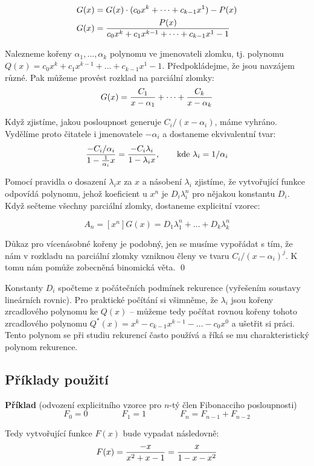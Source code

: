 \begin{align}
G(x) &= G(x)\cdot(c_0x^k + \dots + c_{k-1}x^1) - P(x) \\
G(x) &= {P(x)\over c_0x^k+c_1x^{k-1}+\dots +c_{k-1}x^1-1}
\end{align}

Nalezneme kořeny $\alpha_1, \dots, \alpha_k$ polynomu ve jmenovateli zlomku,
tj. polynomu $Q(x) = c_0x^k+c_1x^{k-1}+\dots +c_{k-1}x^1-1$. Předpokládejme,
že jsou navzájem různé. Pak můžeme provést rozklad na parciální zlomky:
$$G(x) = {C_1\over x-\alpha_1} + \dots + {C_k\over x-\alpha_k}$$

Když zjistíme, jakou posloupnost generuje $C_i/(x-\alpha_i)$, máme
vyhráno. Vydělíme proto čitatele i jmenovatele $-\alpha_i$ a dostaneme
ekvivalentní tvar:
$${-C_i/\alpha_i\over1-{1\over\alpha_i}x} = {-C_i\lambda_i\over 1-\lambda_ix},\qquad\text{kde}~\lambda_i = 1/\alpha_i$$

Pomocí pravidla o dosazení $\lambda_ix$ za $x$ a násobení $\lambda_i$
zjistíme, že vytvořující funkce odpovídá polynomu, jehož koeficient u $x^n$
je $D_i\lambda_i^n$ pro nějakou konstantu $D_i$. Když sečteme všechny parciální zlomky, dostaneme explicitní vzorec:

$$A_n = [x^n]G(x) = D_1\lambda_1^n + \dots + D_k\lambda_k^n$$

Důkaz pro vícenásobné kořeny je podobný, jen se musíme vypořádat s tím, že nám
v rozkladu na parciální zlomky vzniknou členy ve tvaru $C_i/(x-\alpha_i)^j$. K
tomu nám pomůže zobecněná binomická věta.
\qed

Konstanty $D_i$ spočteme z počátečních podmínek rekurence (vyřešením soustavy
lineárních rovnic). Pro praktické počítání si všimněme, že $\lambda_i$ jsou
kořeny zrcadlového polynomu ke $Q(x)$ -- můžeme tedy počítat rovnou kořeny
tohoto zrcadlového polynomu $Q^*(x) = x^k-c_{k-1}x^{k-1}-\dots-c_0x^0$ a ušetřit
si práci. Tento polynom se při studiu rekurencí často používá a říká se mu
charakteristický polynom rekurence.

\subsection{Příklady použití}
\noindent\textbf{Příklad} (odvození explicitního vzorce pro $n$-tý člen Fibonacciho posloupnosti)
$$F_0 = 0\qquad\qquad F_1 = 1\qquad\qquad F_n = F_{n-1} + F_{n-2}$$

Tedy vytvořující funkce $F(x)$ bude vypadat následovně:
$$F(x) = {-x\over x^2+x-1} = {x\over 1-x-x^2}$$

